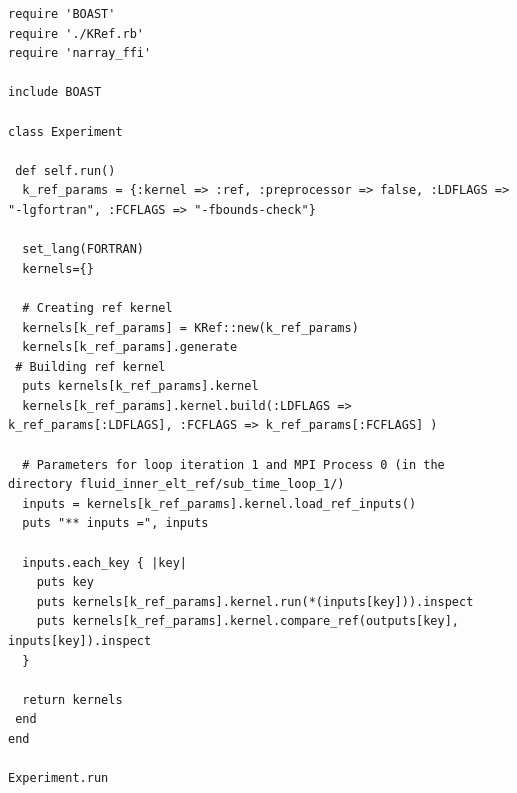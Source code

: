 \documentclass[10pt,twoside]{article}   	%
\begin{document}
\begin{lstlisting}[caption=run.rb]
require 'BOAST'
require './KRef.rb'
require 'narray_ffi'

include BOAST

class Experiment

 def self.run()
  k_ref_params = {:kernel => :ref, :preprocessor => false, :LDFLAGS => "-lgfortran", :FCFLAGS => "-fbounds-check"}

  set_lang(FORTRAN)
  kernels={}

  # Creating ref kernel
  kernels[k_ref_params] = KRef::new(k_ref_params)
  kernels[k_ref_params].generate
 # Building ref kernel
  puts kernels[k_ref_params].kernel
  kernels[k_ref_params].kernel.build(:LDFLAGS => k_ref_params[:LDFLAGS], :FCFLAGS => k_ref_params[:FCFLAGS] )

  # Parameters for loop iteration 1 and MPI Process 0 (in the directory fluid_inner_elt_ref/sub_time_loop_1/)
  inputs = kernels[k_ref_params].kernel.load_ref_inputs()
  puts "** inputs =", inputs

  inputs.each_key { |key|
    puts key
    puts kernels[k_ref_params].kernel.run(*(inputs[key])).inspect
    puts kernels[k_ref_params].kernel.compare_ref(outputs[key], inputs[key]).inspect
  }

  return kernels
 end
end

Experiment.run
\end{lstlisting}
\end{document}

